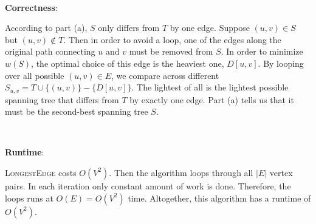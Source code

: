\documentclass{article}
\begin{document}
~

\noindent\textbf{Correctness}:

According to part (a), $S$ only differs from $T$ by one edge. Suppose $(u,v)\in S$ but $(u,v)\notin T$. Then in order to avoid a loop, one of the edges along the original path connecting $u$ and $v$ must be removed from $S$. In order to minimize $w(S)$, the optimal choice of this edge is the heaviest one, $D[u,v]$. By looping over all possible $(u,v)\in E$, we compare across different $S_{u,v}=T\cup\{(u,v)\}-\{D[u,v]\}$. The lightest of all is the lightest possible spanning tree that differs from $T$ by exactly one edge. Part (a) tells us that it must be the second-best spanning tree $S$.

~

\noindent\textbf{Runtime}:

\textsc{LongestEdge} costs $O(V^2)$. Then the algorithm loops through all $|E|$ vertex pairs. In each iteration only constant amount of work is done. Therefore, the loops runs at $O(E)=O(V^2)$ time. Altogether, this algorithm has a runtime of $O(V^2)$.
\end{document}
